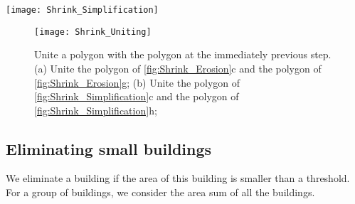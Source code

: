 \begin{figure*}[tb]
	\centering
	\texttt{[image: Shrink\_Simplification]}
	\caption{A building shrinks during growing because of line simplification, 
		where $t_1=0.7$, $t_2=0.8$, and $t_3=1$.
		The small gray polygons represent the original building.
		The process for (a), (b), and (c), and 
		the process for (e), (f), and (g) are the same as 
		the processes in \fig\ref{fig:Shrink_Erosion}.
		(d) The large gray polygon is the target shape on goal map.
		(h) Simplify the polygon in (g) using the Imai--Iri algorithm.
		Note that $d_{l,t_1}<d_{l,t_2}$ see \eq\ref{eq:d_lt}),
		which is why the Imai--Iri algorithm does not 
		remove any point of the polygon in (c),
		but removes two points of the polygon in (g).
		The darker gray pieces in (h) show 
		the parts which are included in the polygon of (c), 
		but not in the polygon of (h).
	}
	\label{fig:Shrink_Simplification}
\end{figure*}

\begin{figure}[tb]
	\centering
	\texttt{[image: Shrink\_Uniting]}
	\caption{Unite a polygon with the polygon at the immediately previous step.
		(a) Unite the polygon of \fig\ref{fig:Shrink_Erosion}c and the 
		polygon of \fig\ref{fig:Shrink_Erosion}g;
		(b) Unite the polygon of \fig\ref{fig:Shrink_Simplification}c and 
		the polygon of \fig\ref{fig:Shrink_Simplification}h;
	}
	\label{fig:Shrink_Uniting}
\end{figure}




\subsection{Eliminating small buildings}
\label{sec:Eliminate}
We eliminate a building if the area of this building is smaller than a 
threshold.
For a group of buildings, we consider the area sum of all the buildings.


